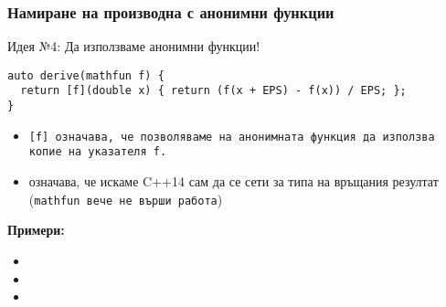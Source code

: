 \documentclass{beamer}
\begin{document}
\begin{frame}[fragile]
  \frametitle{Намиране на производна с анонимни функции}
  \alert{Идея №4:} Да използваме анонимни функции!
  \pause
\begin{lstlisting}
auto derive(mathfun f) {
  return [f](double x) { return (f(x + EPS) - f(x)) / EPS; };
}
\end{lstlisting}
  \pause
  \begin{itemize}[<+->]
  \item \tt{[f]} означава, че позволяваме на анонимната функция да използва копие на указателя \tt{f}.
  \item{} означава, че искаме C++14 сам да се сети за типа на връщания резултат (\alert{\tt{mathfun} вече не върши работа})\\
  \end{itemize}
  \onslide<+->
  \textbf{Примери:}
  \begin{itemize}[<+->]
  \item {}
  \item {}
  \item {}
  \end{itemize}
\end{frame}
\end{document}
